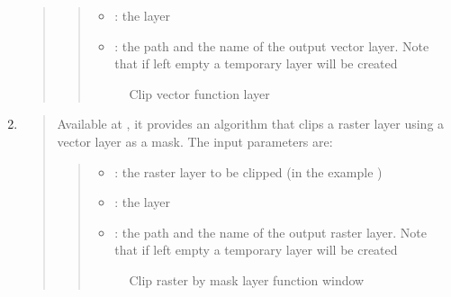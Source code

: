 \documentclass[letterpaper,10pt,english]{sphinxmanual}
\begin{document}
\begin{enumerate}
\begin{quote}
\begin{quote}
\begin{itemize}
\item {} 
: the  layer

\item {} 
: the path and the name of the output vector layer. Note that if left empty a temporary layer will be created

\end{itemize}

\begin{figure}[htbp]
\centering
\capstart

\noindent{}
\caption{Clip vector function layer}\label{\detokenize{preparation/preparation:id7}}\end{figure}
\end{quote}
\end{quote}

\item {} 
\begin{quote}

Available at , it provides an algorithm that clips a raster layer using a vector layer as a mask.
The input parameters are:
\begin{quote}
\begin{itemize}
\item {} 
: the raster layer to be clipped (in the example )

\item {} 
: the  layer

\item {} 
: the path and the name of the output raster layer. Note that if left empty a temporary layer will be created

\end{itemize}

\begin{figure}[htbp]
\centering
\capstart

\noindent{}
\caption{Clip raster by mask layer function window}\label{\detokenize{preparation/preparation:id8}}\end{figure}
\end{quote}
\end{quote}

\end{enumerate}
\end{document}

